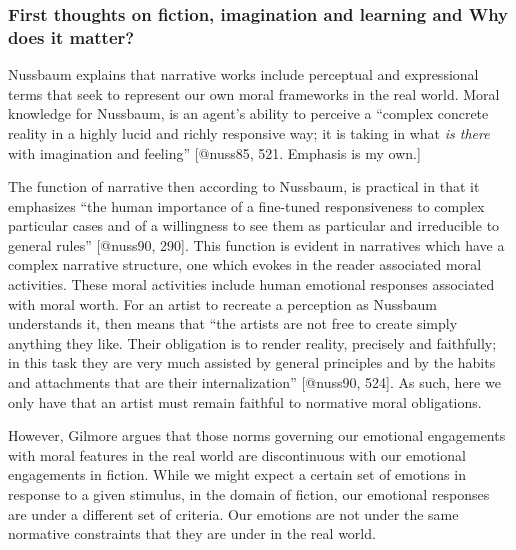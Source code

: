 \documentclass[
  letterpaper,
  DIV=11,
  numbers=noendperiod]{scrartcl}
\theoremstyle{remark}
\begin{document}
\subsubsection*{First thoughts on fiction, imagination and learning and
Why does it
matter?}\label{first-thoughts-on-fiction-imagination-and-learning-and-why-does-it-matter}

Nussbaum explains that narrative works include perceptual and
expressional terms that seek to represent our own moral frameworks in
the real world. Moral knowledge for Nussbaum, is an agent's ability to
perceive a ``complex concrete reality in a highly lucid and richly
responsive way; it is taking in what \emph{is there} with imagination
and feeling'' {[}@nuss85, 521. Emphasis is my own.{]}

The function of narrative then according to Nussbaum, is practical in
that it emphasizes ``the human importance of a fine-tuned responsiveness
to complex particular cases and of a willingness to see them as
particular and irreducible to general rules'' {[}@nuss90, 290{]}. This
function is evident in narratives which have a complex narrative
structure, one which evokes in the reader associated moral activities.
These moral activities include human emotional responses associated with
moral worth. For an artist to recreate a perception as Nussbaum
understands it, then means that ``the artists are not free to create
simply anything they like. Their obligation is to render reality,
precisely and faithfully; in this task they are very much assisted by
general principles and by the habits and attachments that are their
internalization'' {[}@nuss90, 524{]}. As such, here we only have that an
artist must remain faithful to normative moral obligations.

However, Gilmore argues that those norms governing our emotional
engagements with moral features in the real world are discontinuous with
our emotional engagements in fiction. While we might expect a certain
set of emotions in response to a given stimulus, in the domain of
fiction, our emotional responses are under a different set of criteria.
Our emotions are not under the same normative constraints that they are
under in the real world.
\end{document}

